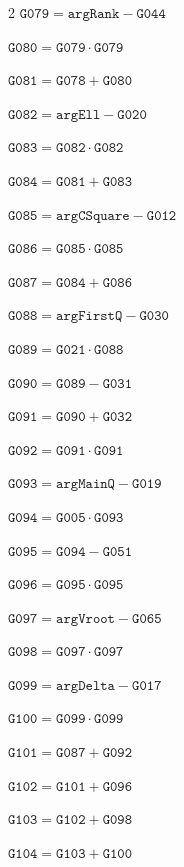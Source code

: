 \documentclass[10pt]{article}
\begin{document}
\begin{multicols}{2}
\noindent $\mathtt{G079}=\mathtt{argRank}-\mathtt{G044}$\par
\noindent $\mathtt{G080}=\mathtt{G079}\cdot \mathtt{G079}$\par
\noindent $\mathtt{G081}=\mathtt{G078}+\mathtt{G080}$\par
\noindent $\mathtt{G082}=\mathtt{argEll}-\mathtt{G020}$\par
\noindent $\mathtt{G083}=\mathtt{G082}\cdot \mathtt{G082}$\par
\noindent $\mathtt{G084}=\mathtt{G081}+\mathtt{G083}$\par
\noindent $\mathtt{G085}=\mathtt{argCSquare}-\mathtt{G012}$\par
\noindent $\mathtt{G086}=\mathtt{G085}\cdot \mathtt{G085}$\par
\noindent $\mathtt{G087}=\mathtt{G084}+\mathtt{G086}$\par
\noindent $\mathtt{G088}=\mathtt{argFirstQ}-\mathtt{G030}$\par
\noindent $\mathtt{G089}=\mathtt{G021}\cdot \mathtt{G088}$\par
\noindent $\mathtt{G090}=\mathtt{G089}-\mathtt{G031}$\par
\noindent $\mathtt{G091}=\mathtt{G090}+\mathtt{G032}$\par
\noindent $\mathtt{G092}=\mathtt{G091}\cdot \mathtt{G091}$\par
\noindent $\mathtt{G093}=\mathtt{argMainQ}-\mathtt{G019}$\par
\noindent $\mathtt{G094}=\mathtt{G005}\cdot \mathtt{G093}$\par
\noindent $\mathtt{G095}=\mathtt{G094}-\mathtt{G051}$\par
\noindent $\mathtt{G096}=\mathtt{G095}\cdot \mathtt{G095}$\par
\noindent $\mathtt{G097}=\mathtt{argVroot}-\mathtt{G065}$\par
\noindent $\mathtt{G098}=\mathtt{G097}\cdot \mathtt{G097}$\par
\noindent $\mathtt{G099}=\mathtt{argDelta}-\mathtt{G017}$\par
\noindent $\mathtt{G100}=\mathtt{G099}\cdot \mathtt{G099}$\par
\noindent $\mathtt{G101}=\mathtt{G087}+\mathtt{G092}$\par
\noindent $\mathtt{G102}=\mathtt{G101}+\mathtt{G096}$\par
\noindent $\mathtt{G103}=\mathtt{G102}+\mathtt{G098}$\par
\noindent $\mathtt{G104}=\mathtt{G103}+\mathtt{G100}$\par
\end{multicols}
\end{document}
